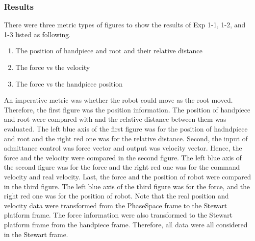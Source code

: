 \subsubsection{Results}
\hspace*{6mm} There were three metric types of figures to show the results of Exp 1-1, 1-2, and 1-3 listed as following.
\begin{enumerate}
	\item The position of handpiece and root and their relative distance
	\item The force vs the velocity
	\item The force vs the handpiece position
\end{enumerate}
\hspace*{6mm}An imperative metric was whether the robot could move as the root moved. Therefore, the first figure was the position information. The position of handpiece and root were compared with and the relative distance between them was evaluated. The left blue axis of the first figure was for the position of hadndpiece and root and the right red one was for the relative distance. Second, the input of admittance control was force vector and output was velocity vector. Hence, the force and the velocity were compared in the second figure. The left blue axis of the second figure was for the force and the right red one was for the command velocity and real velocity. Last, the force and the position of robot were compared in the third figure. The left blue axis of the third figure was for the force, and the right red one was for the position of robot. Note that the real position and velocity data were transformed from the PhaseSpace frame to the Stewart platform frame. The force information were also transformed to the Stewart platform frame from the handpiece frame. Therefore, all data were all considered in the Stewart frame.
